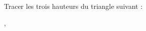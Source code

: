 
\begin{exercice}\label{exosmath-0958}

Tracer les trois hauteurs du triangle suivant :
\begin{center}
   ,
\end{center}


\end{exercice}

